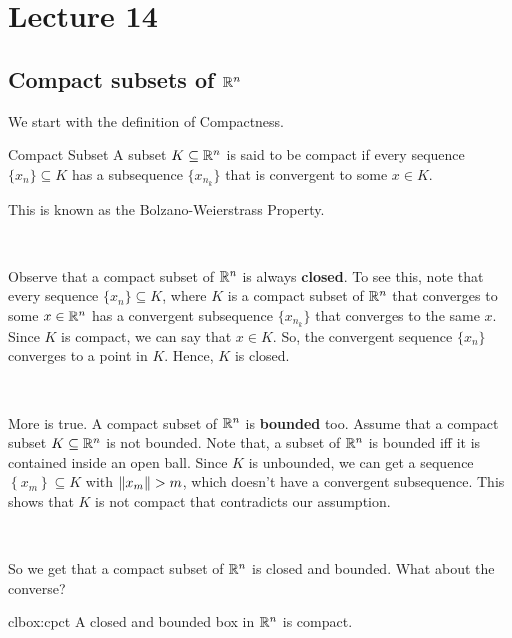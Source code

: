 \documentclass[../Analysis-3.tex]{subfiles}
\begin{document}
\chapter*{Lecture 14} %
\setcounter{chapter}{14} %
\setcounter{section}{0}

\section{Compact subsets of $ \mathbb{R}^n $}

We start with the definition of Compactness.
\begin{Def}{Compact Subset}{}
  A subset $ K \subseteq \mathbb{R}^n $ is said to be compact if every sequence $ \{x_n\} \subseteq K $ has a subsequence $ \{x_{n_k}\} $ that is convergent to some $ x \in K $.
\end{Def}

This is known as the Bolzano-Weierstrass Property.

\

Observe that a compact subset of $ \mathbb{R}^n $ is always \textbf{closed}. To see this, note that every sequence $ \{x_n\} \subseteq K $, where $ K $ is a compact subset of $ \mathbb{R}^n $ that converges to some $ x \in \mathbb{R}^n $ has a convergent subsequence $ \{x_{n_k}\} $ that converges to the same $ x $. Since $ K $ is compact, we can say that $ x \in K $. So, the convergent sequence $ \{x_n\} $ converges to a point in $ K $. Hence, $ K $ is closed.

\

More is true. A compact subset of $ \mathbb{R}^n $ is \textbf{bounded} too. Assume that a compact subset $ K \subseteq \mathbb{R}^n $ is not bounded. Note that, a subset of $ \mathbb{R}^n $ is bounded iff it is contained inside an open ball. Since $ K $ is unbounded, we can get a sequence $ \left\{ x_m \right\} \subseteq K $ with $ \norm{x_m} > m $, which doesn't have a convergent subsequence. This shows that $ K $ is not compact that contradicts our assumption.

\

So we get that a compact subset of $ \mathbb{R}^n $ is closed and bounded. What about the converse?

\begin{Thm}{}{clbox:cpct}
  A closed and bounded box in $ \mathbb{R}^n $ is compact.
\end{Thm}
\end{document}
